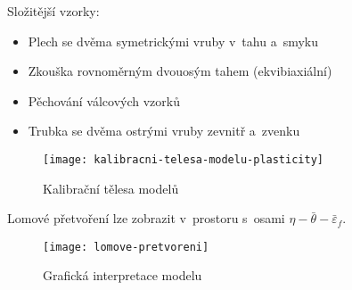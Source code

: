 Složitější vzorky:
\begin{itemize}
	\item Plech se dvěma symetrickými vruby v~tahu a~smyku
	\item Zkouška rovnoměrným dvouosým tahem (ekvibiaxiální)
	\item Pěchování válcových vzorků
	\item Trubka se dvěma ostrými vruby zevnitř a~zvenku
\end{itemize}

\begin{figure}[H]
	\label{fig:kalibracni-telesa-modelu-plasticity}
	\centering
	\texttt{[image: kalibracni-telesa-modelu-plasticity]}
	\caption{Kalibrační tělesa modelů}
\end{figure}

Lomové přetvoření lze zobrazit v~prostoru s~osami $\eta-\bar{\theta}-\bar{\varepsilon}_f$.
\begin{figure}[H]
	\label{fig:lomove-pretvoreni}
	\centering
	\texttt{[image: lomove-pretvoreni]}
	\caption{Grafická interpretace modelu}
\end{figure}
